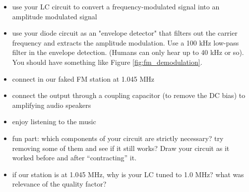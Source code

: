 \documentclass[11pt]{article}
\begin{document}
\begin{itemize}
\item use your LC circuit to convert a frequency-modulated signal into an amplitude modulated signal
\item use your diode circuit as an "envelope detector" that filters out the carrier frequency and extracts the
amplitude modulation.  Use a 100 kHz low-pass filter in the envelope detection. (Humans can only hear up to 40 kHz
or so).  You should have something like Figure \ref{fig:fm_demodulation}.
\item connect in our faked FM station at 1.045 MHz
\item connect the output through a coupling capacitor (to remove the DC bias) to amplifying audio speakers
\item enjoy listening to the music
\item fun part: which components of your circuit are strictly necessary?  try removing some of them and see
if it still works?  Draw your circuit as it worked before and after ``contracting'' it.
\item if our station is at 1.045 MHz, why is your LC tuned to 1.0 MHz?  what was relevance of the quality factor?
\end{itemize}
\end{document}
